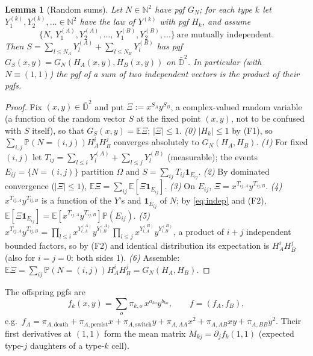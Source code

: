 \documentclass[11pt]{article}
\newtheorem{lemma}[theorem]{Lemma}
\theoremstyle{definition}
\theoremstyle{remark}
\newcommand{\E}{\mathbb{E}}
\newcommand{\Prob}{\mathbb{P}}
\newcommand{\N}{\mathbb{N}}
\newcommand{\Dbar}{\bar{\mathbb D}^2}
\newcommand{\one}{\mathbf 1}
\begin{document}
\begin{lemma}[Random sums]\label{lem:sums}
Let $N\in\N^2$ have pgf $G_N$; for each type $k$ let $Y^{(k)}_1,Y^{(k)}_2,\dots\in\N^2$ have the law of $Y^{(k)}$ with pgf $H_k$, and assume
\begin{equation}\label{eq:indep}
\{N,\ Y^{(A)}_1,Y^{(A)}_2,\dots,\ Y^{(B)}_1,Y^{(B)}_2,\dots\}\ \text{are mutually independent.}
\end{equation}
Then $S=\sum_{l\le N_A}Y^{(A)}_l+\sum_{l\le N_B}Y^{(B)}_l$ has pgf $G_S(x,y)=G_N(H_A(x,y),H_B(x,y))$ on $\Dbar$. In particular (with $N\equiv(1,1)$) the pgf of a sum of two independent vectors is the product of their pgfs.
\end{lemma}
\begin{proof}
Fix $(x,y)\in\Dbar$ and put $\Xi:=x^{S_A}y^{S_B}$, a complex-valued random variable (a function of the random vector $S$ at the fixed point $(x,y)$, not to be confused with $S$ itself), so that $G_S(x,y)=\E\Xi$; $|\Xi|\le1$. \emph{(0)} $|H_k|\le1$ by (F1), so $\sum_{i,j}\Prob(N=(i,j))H_A^iH_B^j$ converges absolutely to $G_N(H_A,H_B)$. \emph{(1)} For fixed $(i,j)$ let $T_{ij}=\sum_{l\le i}Y^{(A)}_l+\sum_{l\le j}Y^{(B)}_l$ (measurable); the events $E_{ij}=\{N=(i,j)\}$ partition $\Omega$ and $S=\sum_{ij}T_{ij}\one_{E_{ij}}$. \emph{(2)} By dominated convergence ($|\Xi|\le1$), $\E \Xi=\sum_{ij}\E[\Xi\one_{E_{ij}}]$. \emph{(3)} On $E_{ij}$, $\Xi=x^{T_{ij,A}}y^{T_{ij,B}}$. \emph{(4)} $x^{T_{ij,A}}y^{T_{ij,B}}$ is a function of the $Y$'s and $\one_{E_{ij}}$ of $N$; by \eqref{eq:indep} and (F2), $\E[\Xi\one_{E_{ij}}]=\E[x^{T_{ij,A}}y^{T_{ij,B}}]\Prob(E_{ij})$. \emph{(5)} $x^{T_{ij,A}}y^{T_{ij,B}}=\prod_{l\le i}x^{Y^{(A)}_{l,A}}y^{Y^{(A)}_{l,B}}\prod_{l\le j}x^{Y^{(B)}_{l,A}}y^{Y^{(B)}_{l,B}}$, a product of $i+j$ independent bounded factors, so by (F2) and identical distribution its expectation is $H_A^iH_B^j$ (also for $i=j=0$: both sides 1). \emph{(6)} Assemble: $\E \Xi=\sum_{ij}\Prob(N=(i,j))H_A^iH_B^j=G_N(H_A,H_B)$.
\end{proof}

\noindent The offspring pgfs are
\[
f_k(x,y)=\sum_o\pi_{k,o}\,x^{a_{ko}}y^{b_{ko}},\qquad f=(f_A,f_B),
\]
e.g.\ $f_A=\pi_{A,\mathrm{death}}+\pi_{A,\mathrm{persist}}x+\pi_{A,\mathrm{switch}}y+\pi_{A,AA}x^2+\pi_{A,AB}xy+\pi_{A,BB}y^2$. Their first derivatives at $(1,1)$ form the mean matrix $M_{kj}=\partial_jf_k(1,1)$ (expected type-$j$ daughters of a type-$k$ cell).

\end{document}
